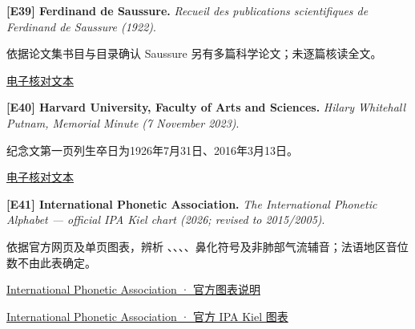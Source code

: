 \par\noindent\begin{minipage}{\linewidth}
\label{ref-39}\noindent\textbf{[E39] Ferdinand de Saussure.} \textit{Recueil des publications scientifiques de Ferdinand de Saussure (1922)}.\par\nobreak
依据论文集书目与目录确认 Saussure 另有多篇科学论文；未逐篇核读全文。\par
{\small\href{https://fr.wikisource.org/wiki/Recueil_des_publications_scientifiques_de_Ferdinand_de_Saussure}{电子核对文本}}\par
\par\end{minipage}\par

\par\noindent\begin{minipage}{\linewidth}
\label{ref-40}\noindent\textbf{[E40] Harvard University, Faculty of Arts and Sciences.} \textit{Hilary Whitehall Putnam, Memorial Minute (7 November 2023)}.\par\nobreak
纪念文第一页列生卒日为1926年7月31日、2016年3月13日。\par
{\small\href{https://officeofthesecretary.fas.harvard.edu/sites/g/files/omnuum2291/files/2024-11/Putnam%20Memorial%20Minute_2023_11_07.pdf}{电子核对文本}}\par
\par\end{minipage}\par

\par\noindent\begin{minipage}{\linewidth}
\label{ref-41}\noindent\textbf{[E41] International Phonetic Association.} \textit{The International Phonetic Alphabet — official IPA Kiel chart (2026; revised to 2015/2005)}.\par\nobreak
依据官方网页及单页图表，辨析 、、、、鼻化符号及非肺部气流辅音；法语地区音位数不由此表确定。\par
{\small\href{https://www.internationalphoneticassociation.org/content/ipa-chart}{International Phonetic Association · 官方图表说明}}\par
{\small\href{https://www.internationalphoneticassociation.org/IPAcharts/common_files/pdfs/pdfs_IPA_charts_E/IPA_Kiel.pdf}{International Phonetic Association · 官方 IPA Kiel 图表}}\par
\par\end{minipage}\par

